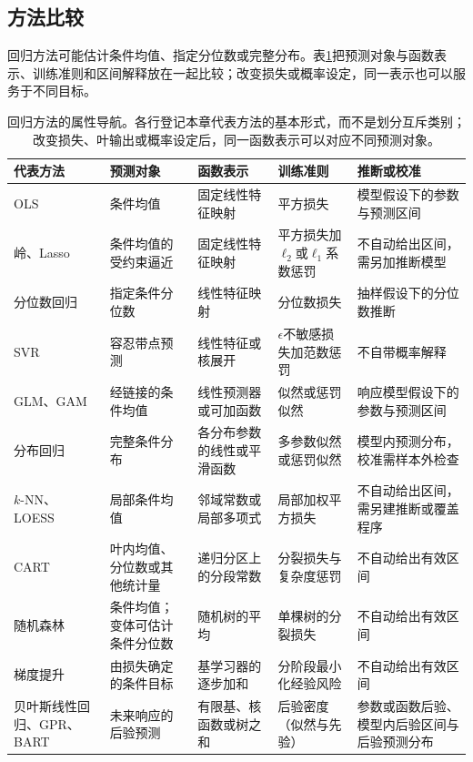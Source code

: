 \subsection{方法比较}

回归方法可能估计条件均值、指定分位数或完整分布。表\ref{tab:regression-navigation}把预测对象与函数表示、训练准则和区间解释放在一起比较；改变损失或概率设定，同一表示也可以服务于不同目标。

\begin{table}[htbp]
  \centering
  \small
  \begin{tabularx}{\linewidth}{@{}>{\RaggedRight\arraybackslash}p{25mm}>{\RaggedRight\arraybackslash}X>{\RaggedRight\arraybackslash}X>{\RaggedRight\arraybackslash}X>{\RaggedRight\arraybackslash}X@{}}
    \toprule
    代表方法 & 预测对象 & 函数表示 & 训练准则 & 推断或校准 \\
    \midrule
    OLS & 条件均值 & 固定线性特征映射 & 平方损失 & 模型假设下的参数与预测区间 \\
    岭、Lasso & 条件均值的受约束逼近 & 固定线性特征映射 & 平方损失加$\ell_2$或$\ell_1$系数惩罚 & 不自动给出区间，需另加推断模型 \\
    分位数回归 & 指定条件分位数 & 线性特征映射 & 分位数损失 & 抽样假设下的分位数推断 \\
    SVR & 容忍带点预测 & 线性特征或核展开 & $\epsilon$不敏感损失加范数惩罚 & 不自带概率解释 \\
    GLM、GAM & 经链接的条件均值 & 线性预测器或可加函数 & 似然或惩罚似然 & 响应模型假设下的参数与预测区间 \\
    分布回归 & 完整条件分布 & 各分布参数的线性或平滑函数 & 多参数似然或惩罚似然 & 模型内预测分布，校准需样本外检查 \\
    $k$-NN、LOESS & 局部条件均值 & 邻域常数或局部多项式 & 局部加权平方损失 & 不自动给出区间，需另建推断或覆盖程序 \\
    CART & 叶内均值、分位数或其他统计量 & 递归分区上的分段常数 & 分裂损失与复杂度惩罚 & 不自动给出有效区间 \\
    随机森林 & 条件均值；变体可估计条件分位数 & 随机树的平均 & 单棵树的分裂损失 & 不自动给出有效区间 \\
    梯度提升 & 由损失确定的条件目标 & 基学习器的逐步加和 & 分阶段最小化经验风险 & 不自动给出有效区间 \\
    贝叶斯线性回归、GPR、BART & 未来响应的后验预测 & 有限基、核函数或树之和 & 后验密度（似然与先验） & 参数或函数后验、模型内后验区间与后验预测分布 \\
    \bottomrule
  \end{tabularx}
  \caption{回归方法的属性导航。各行登记本章代表方法的基本形式，而不是划分互斥类别；改变损失、叶输出或概率设定后，同一函数表示可以对应不同预测对象。}
  \label{tab:regression-navigation}
\end{table}

